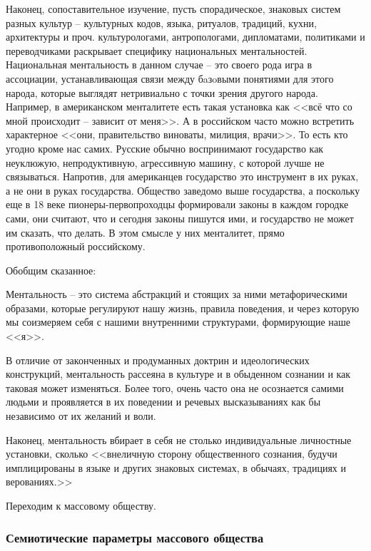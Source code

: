 Наконец, сопоставительное изучение, пусть спорадическое, знаковых систем разных культур -- культурных кодов,
языка, ритуалов, традиций, кухни, архитектуры и проч. культурологами, антропологами, дипломатами,
политиками и переводчиками раскрывает специфику национальных ментальностей. Национальная ментальность
в данном случае -- это своего рода игра в ассоциации, устанавливающая связи между бaзoвыми понятиями
для этого народа, которые выглядят нетривиально с точки зрения другого народа.
Например, в американском менталитете есть такая установка как <<всё что со мной происходит -- зависит от меня>>.
А в российском часто можно встретить характерное <<они, правительство виноваты, милиция, врачи>>.
То есть кто угодно кроме нас самих. Русские обычно воспринимают государство как неуклюжую, непродуктивную,
агрессивную машину, с которой лучше не связываться. Напротив, для американцев государство это инструмент в
их руках, а не они в руках государства. Общество заведомо выше государства, а поскольку еще в 18 веке
пионеры-первопроходцы формировали законы в каждом городке сами, они считают, что и сегодня законы пишутся
ими, и государство не может им сказать, что делать. В этом смысле у них менталитет, прямо
противоположный российскому.

Обобщим сказанное:

Ментальность -- это система абстракций и стоящих за ними метафорическими образами,
которые регулируют нашу жизнь, правила поведения, и через которую мы соизмеряем себя
с нашими внутренними структурами, формирующие наше <<я>>.

В отличие от законченных и продуманных доктрин и идеологических конструкций, ментальность
рассеяна в культуре и в обыденном сознании и как таковая может изменяться.
Более того, очень часто она не осознается самими людьми и проявляется в их поведении
и речевых высказываниях как бы независимо от их желаний и воли.

Наконец, ментальность вбирает в себя не столько индивидуальные личностные установки,
сколько <<внеличную сторону общественного сознания, будучи имплицированы в языке и
других знаковых системах, в обычаях, традициях и верованиях.>>\autocite{gurevich_history}

Переходим к массовому обществу.

\subsubsection{Семиотические параметры массового общества}
\label{1.3}

